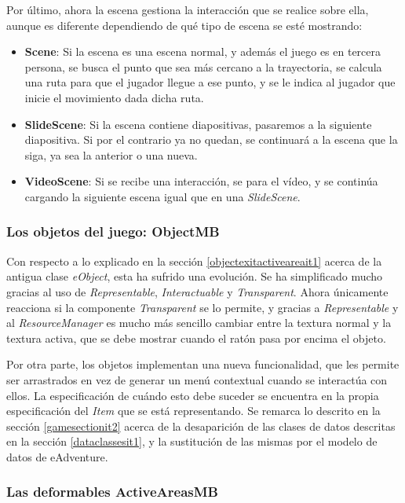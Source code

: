 Por último, ahora la escena gestiona la interacción que se realice sobre ella, aunque es diferente dependiendo de qué tipo de escena se esté mostrando:
\begin{itemize}
	\item \textbf{Scene}: Si la escena es una escena normal, y además el juego es en tercera persona, se busca el punto que sea más cercano a la trayectoria, se calcula una ruta para que el jugador llegue a ese punto, y se le indica al jugador que inicie el movimiento dada dicha ruta.
	
	\item \textbf{SlideScene}: Si la escena contiene diapositivas, pasaremos a la siguiente diapositiva. Si por el contrario ya no quedan, se continuará a la escena que la siga, ya sea la anterior o una nueva.
	
	\item \textbf{VideoScene}: Si se recibe una interacción, se para el vídeo, y se continúa cargando la siguiente escena igual que en una \textit{SlideScene}.
\end{itemize}

\subsubsection{Los objetos del juego: ObjectMB}

Con respecto a lo explicado en la sección \ref{objectexitactiveareait1} acerca de la antigua clase \textit{eObject}, esta ha sufrido una evolución. Se ha simplificado mucho gracias al uso de \textit{Representable}, \textit{Interactuable} y \textit{Transparent}. Ahora únicamente reacciona si la componente \textit{Transparent} se lo permite, y gracias a \textit{Representable} y al \textit{ResourceManager} es mucho más sencillo cambiar entre la textura normal y la textura activa, que se debe mostrar cuando el ratón pasa por encima el objeto.

Por otra parte, los objetos implementan una nueva funcionalidad, que les permite ser arrastrados en vez de generar un menú contextual cuando se interactúa con ellos. La especificación de cuándo esto debe suceder se encuentra en la propia especificación del \textit{Item} que se está representando. Se remarca lo descrito en la sección \ref{gamesectionit2} acerca de la desaparición de las clases de datos descritas en la sección \ref{dataclassesit1}, y la sustitución de las mismas por el modelo de datos de eAdventure.

\subsubsection{Las deformables ActiveAreasMB}
\label{activeareasectionit2}

